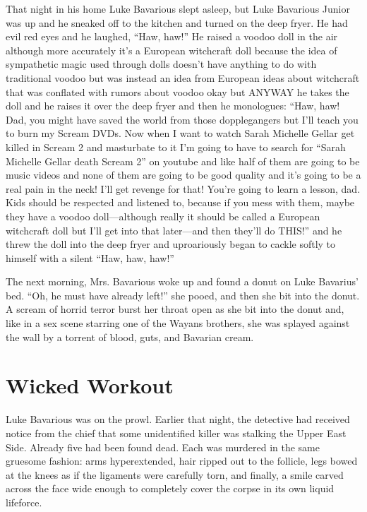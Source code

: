 That night in his home Luke Bavarious slept asleep, but Luke
Bavarious Junior was up and he sneaked off to the kitchen and
turned on the deep fryer. He had evil red eyes and he laughed,
``Haw, haw!'' He raised a voodoo doll in the air although
more accurately it's a European witchcraft doll because the
idea of sympathetic magic used through dolls doesn't have
anything to do with traditional voodoo but was instead an idea from
European ideas about witchcraft that was conflated with rumors
about voodoo okay but ANYWAY he takes the doll and he raises it
over the deep fryer and then he monologues: ``Haw, haw! Dad,
you might have saved the world from those dopplegangers but
I'll teach you to burn my Scream DVDs. Now when I want to
watch Sarah Michelle Gellar get killed in Scream 2 and masturbate
to it I'm going to have to search for ``Sarah Michelle
Gellar death Scream 2'' on youtube and like half of them are
going to be music videos and none of them are going to be good
quality and it's going to be a real pain in the neck!
I'll get revenge for that! You're going to learn a
lesson, dad. Kids should be respected and listened to, because if
you mess with them, maybe they have a voodoo doll---although
really it should be called a European witchcraft doll but
I'll get into that later---and then they'll do
THIS!'' and he threw the doll into the deep fryer and
uproariously began to cackle softly to himself with a silent
``Haw, haw, haw!''



The next morning, Mrs. Bavarious woke up and found a donut on Luke
Bavarius' bed. ``Oh, he must have already left!''
she pooed, and then she bit into the donut. A scream of horrid
terror burst her throat open as she bit into the donut and, like in
a sex scene starring one of the Wayans brothers, she was splayed
against the wall by a torrent of blood, guts, and Bavarian cream. 

 





\chapter{ Wicked Workout}



Luke Bavarious was on the prowl. Earlier that night, the detective
had received notice from the chief that some unidentified killer
was stalking the Upper East Side. Already five had been found dead.
Each was murdered in the same gruesome fashion: arms hyperextended,
hair ripped out to the follicle, legs bowed at the knees as if the
ligaments were carefully torn, and finally, a smile carved across
the face wide enough to completely cover the corpse in its own
liquid lifeforce.



